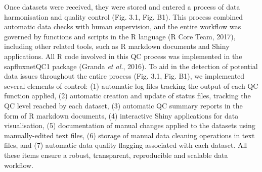 \documentclass[11pt,twoside]{reedthesis}
\begin{document}
Once datasets were received, they were stored and entered a process of
data harmonisation and quality control (Fig. 3.1, Fig. B1). This process
combined automatic data checks with human supervision, and the entire
workflow was governed by functions and scripts in the R language (R Core
Team, 2017), including other related tools, such as R markdown documents
and Shiny applications. All R code involved in this QC process was
implemented in the sapfluxnetQC1 package (Granda \emph{et al.}, 2016).
To aid in the detection of potential data issues throughout the entire
process (Fig. 3.1, Fig. B1), we implemented several elements of control:
(1) automatic log files tracking the output of each QC function applied,
(2) automatic creation and update of status files, tracking the QC level
reached by each dataset, (3) automatic QC summary reports in the form of
R markdown documents, (4) interactive Shiny applications for data
visualisation, (5) documentation of manual changes applied to the
datasets using manually-edited text files, (6) storage of manual data
cleaning operations in text files, and (7) automatic data quality
flagging associated with each dataset. All these items ensure a robust,
transparent, reproducible and scalable data workflow.\par
\end{document}
